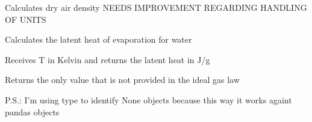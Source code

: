 \documentclass[a4paper,10pt,oneside]{sphinxmanual}
\begin{document}
\begin{fulllineitems}
\label{pymicra:pymicra.physics.dryAirDensity_from_p}
Calculates dry air density
NEEDS IMPROVEMENT REGARDING HANDLING OF UNITS

\end{fulllineitems}


\begin{fulllineitems}
\label{pymicra:pymicra.physics.latent_heat_water}
Calculates the latent heat of evaporation for water

Receives T in Kelvin and returns the latent heat in J/g

\end{fulllineitems}


\begin{fulllineitems}
\label{pymicra:pymicra.physics.perfGas}
Returns the only value that is not provided in the ideal gas law

P.S.: I'm using type to identify None objects because this way it works
againt pandas objects

\end{fulllineitems}

\end{document}
